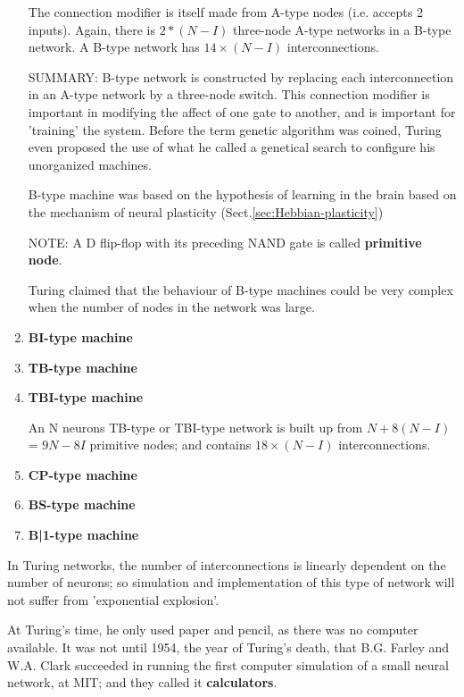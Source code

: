 \begin{enumerate}
The connection modifier is itself made from A-type nodes (i.e. accepts 2
inputs).
Again, there is $2*(N-I)$ three-node A-type networks in a B-type network. A
B-type network has $14\times(N-I)$ interconnections.

SUMMARY: B-type network is constructed by replacing each interconnection in an
A-type network by a three-node switch. This connection modifier is important in
modifying the affect of one gate to
 another, and is important for 'training' the system. Before the term genetic
 algorithm was coined, Turing even proposed the use of what he called a
 genetical search to configure his unorganized machines.

 B-type machine was based on the hypothesis of learning in the brain based on
 the mechanism of neural plasticity (Sect.\ref{sec:Hebbian-plasticity})

NOTE: A D flip-flop with its preceding NAND gate is called {\bf primitive node}.

Turing claimed that the behaviour of B-type machines could be very complex when
the number of nodes in the network was large.

  \item {\bf BI-type machine}
  
  \item {\bf TB-type machine}
  
  \item {\bf TBI-type machine}
  
An N neurons TB-type or TBI-type network is built up from $N+8(N-I)$ = 
$9N-8I$ primitive nodes; and contains $18\times (N-I)$ interconnections. 

  \item  {\bf CP-type machine}
  
  \item {\bf BS-type machine} 
  
  \item {\bf B|1-type machine}
  
  
\end{enumerate}

In Turing networks, the number of interconnections is linearly dependent on the
number of neurons; so simulation and implementation of this type of network will
not suffer from 'exponential explosion'.

At Turing's time, he only used paper and pencil, as there was no computer
available. It was not until 1954, the year of Turing's death, that B.G. Farley
and W.A. Clark succeeded in running the first computer simulation of a small
neural network, at MIT; and they called it {\bf calculators}.

